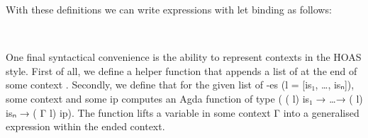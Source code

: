 With these definitions we can write expressions with let binding as follows:
\begin{code}%
%
\>[2]\AgdaFunction{\AgdaUnderscore{}}\AgdaSpace{}%
\AgdaSymbol{:}\AgdaSpace{}%
\AgdaSpace{}%
\AgdaSpace{}%
\AgdaSymbol{(}\AgdaSpace{}%
\AgdaInductiveConstructor{[]}\AgdaSymbol{)}\<%
\\
%
\>[2]\AgdaSymbol{\AgdaUnderscore{}}\AgdaSpace{}%
\AgdaSymbol{=}\AgdaSpace{}%
\AgdaSpace{}%
\AgdaSpace{}%
\AgdaFunction{:=}\AgdaSpace{}%
\AgdaSpace{}%
\AgdaSpace{}%
\AgdaSpace{}%
\AgdaSpace{}%
\AgdaFunction{:=}\AgdaSpace{}%
\AgdaSpace{}%
\AgdaSpace{}%
\AgdaSpace{}%
\AgdaSpace{}%
\AgdaSymbol{(}\AgdaSpace{}%
\AgdaSpace{}%
\AgdaSymbol{)}\AgdaSpace{}%
\AgdaSpace{}%
\<%
\end{code}
One final syntactical convenience is the ability to
represent contexts in the HOAS style.
First of all, we define a helper function  that appends a list of 
at the end of some context .
Secondly, we define  that for the given list of -es
(l = [is₁, \dots, isₙ]), some context  and some 
ip computes an Agda function of type ( (  l) is₁ →
\dots →  (  l) isₙ →  ( Γ l) ip).
The function  lifts a variable in some context Γ into
a generalised expression within the ended context.
